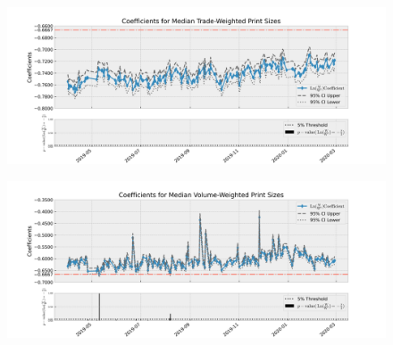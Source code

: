 \documentclass[12pt,a4paper]{article}
\begin{document}
\newpage
\begin{landscape}
\begin{figure}
\includegraphics[scale=0.8]{../../times_series_reg_coefficients/res_printsize_tw.jpg} 
\end{figure}
\end{landscape}

\newpage
\begin{landscape}
\begin{figure}
\includegraphics[scale=0.8]{../../times_series_reg_coefficients/res_printsize_vw.jpg} 
\end{figure}
\end{landscape}
\end{document}
